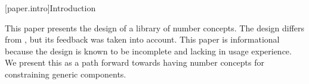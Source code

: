 

[paper.intro]{Introduction}

\pnum
This paper presents the design of a library of number concepts.
The design differs from , but its feedback was taken into account.
This paper is informational because the design is known to be incomplete and lacking in usage experience.
We present this as a path forward towards having number concepts for constraining generic components.
